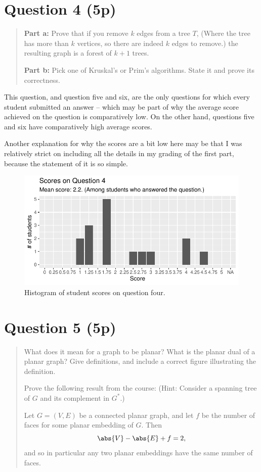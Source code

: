 \documentclass[nobib]{tufte-handout}
\begin{document}
\section{Question 4 (5p)} %
\begin{quotation}
  \textbf{Part a:} Prove that if you remove $k$ edges from a tree $T$, (Where the tree has more than $k$ vertices, so there are indeed $k$ edges to remove.) the resulting graph is a forest of $k+1$ trees.
  \vspace{0.5cm}

  \noindent
  \textbf{Part b:} Pick one of Kruskal's or Prim's algorithms. State it and prove its correctness.
\end{quotation}

This question, and question five and six, are the only questions for which every student submitted an answer -- which may be part of why the average score achieved on the question is comparatively low. On the other hand, questions five and six have comparatively high average scores.

Another explanation for why the scores are a bit low here may be that I was relatively strict on including all the details in my grading of the first part, because the statement of it is so simple.

\begin{figure}[p]
  \centering
  \includegraphics[width = \textwidth]{Q4.pdf}
  \caption[Score histogram for Q4]{Histogram of student scores on question four.}
  \label{fig:Q4}
\end{figure}

\section{Question 5 (5p)} %

\begin{quotation}
  What does it mean for a graph to be planar? What is the planar dual of a planar graph? Give definitions, and include a correct figure illustrating the definition.

  Prove the following result from the course: (Hint: Consider a spanning tree of $G$ and its complement in $G^*$.)
  \begin{theorem}
    Let $G = (V,E)$ be a connected planar graph, and let $f$ be the number of faces for some planar embedding of $G$. Then
    $$\abs{V} - \abs{E} + f = 2,$$
    and so in particular any two planar embeddings have the same number of faces.
  \end{theorem}
\end{quotation}
\end{document}
